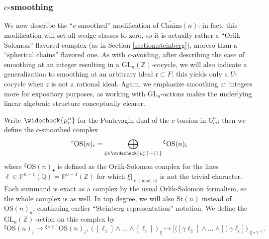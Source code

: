 \documentclass[10pt]{amsart}
\theoremstyle{definition}
\newcommand{\Z}{\mathbb{Z}}
\newcommand{\Q}{\mathbb{Q}}
\renewcommand{\c}{\mathfrak{c}}
\newcommand{\St}{\mathrm{St}}
\newcommand{\OS}{\mathrm{OS}}
\newcommand{\Chains}{\mathrm{Chains}}
\newcommand{\G}{\mathbb{G}}
\renewcommand{\P}{\mathbb{P}}
\newcommand{\GL}{\mathrm{GL}}
\numberwithin{equation}{section}
\begin{document}
    \subsubsection{$c$-smoothing}
    We now describe the ``$c$-smoothed'' modification of $\widetilde{\Chains}(n)$: in fact, this modification will set all wedge classes to zero, so it is actually rather a ``Orlik-Solomon''-flavored complex (as in Section \ref{section:steinberg}), moreso than a ``spherical chains'' flavored one. As with $c$-avoiding, after describing the case of smoothing at an integer resulting in a $\GL_n(\Z)$-cocycle, we will also indicate a generalization to smoothing at an arbitrary ideal $\c\subset F$; this yields only a $U$-cocycle when $\c$ is not a rational ideal. Again, we emphasize smoothing at integers more for expository purposes, as working with $\GL_n$-actions makes the underlying linear algebraic structure conceptually clearer.
    
    Write $\widecheck{\mu_{c}^n}$ for the Pontryagin dual of the $c$-torsion in $\G_m^n$; then we define the $c$-smoothed complex
    \[
    {}^c\OS(n)_i=\bigoplus_{\xi\in \widecheck{\mu_{c}^n}-\{1\}} {}^\xi\OS(n)_i
    \]
    where ${}^\xi\OS(n)_\bullet$ is defined as the Orlik-Solomon complex for the lines $\ell\in \P^{n-1}(\Q)=\P^{n-1}(\Z)$ for which $\xi|_{\ell \pmod c}$ is not the trivial character. Each summand is exact as a complex by the usual Orlik-Solomon formalism, so the whole complex is as well. In top degree, we will also $\St(n)$ instead of $\OS(n)_n$, continuing earlier ``Steinberg representation'' notation. We define the $\GL_n(\Z)$-action on this complex by
    \[
        {}^\xi\OS(n)_i\to {}^{ \xi\circ \gamma^{-1}}\OS(n)_i, ([\ell_1]\wedge \ldots \wedge [\ell_i])_\xi \mapsto [([\gamma\ell_1]\wedge \ldots \wedge [(\gamma\ell_i])_{\xi\circ \gamma^{-1}}.
    \]
\end{document}
